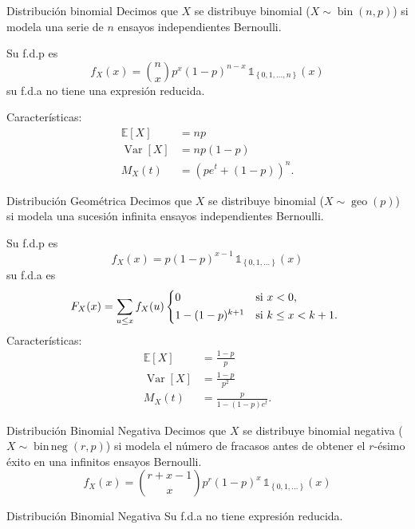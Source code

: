 \documentclass[a4paper]{article}
\theoremstyle{mytheoremstyle}
\newcommand{\E}{\mathbb{E}}
\newcommand{\1}{\mathds{1}}
\providecommand{\set}[1]{\left\{#1\right\}}
\DeclareMathOperator{\Var}{Var}
\DeclareMathOperator{\bin}{bin}
\DeclareMathOperator{\geo}{geo}
\DeclareMathOperator{\binneg}{bin\,neg}
\begin{document}
\begin{multicols*}{3}
\columnbreak

\begin{roundbox}{Distribución binomial}
    Decimos que $X$ se distribuye binomial ($X \sim \bin(n,p)$) si modela una serie de $n$ ensayos independientes Bernoulli.

    Su f.d.p es 
    \[
        f_X(x) = \binom{n}{x} p^x (1-p)^{n-x} \, \1_{\set{0, 1, \dots, n}} (x)
    \]
    su f.d.a no tiene una expresión reducida. 

    Características:
    \begin{align*}
        \E[X] &= np \\
        \Var[X] &= np(1-p) \\
        M_X(t) &= (pe^t + (1-p))^n.
    \end{align*}
\end{roundbox}

\begin{roundbox}{Distribución Geométrica}
    Decimos que $X$ se distribuye binomial ($X \sim \geo(p)$) si modela una sucesión infinita ensayos independientes Bernoulli.

    Su f.d.p es 
    \[
        f_X(x) = p (1-p)^{x-1} \, \1_{\set{0,1, \dots}}(x)
    \]
    su f.d.a es
    \[
        F_X (x) = \sum_{u \leq x} f_X (u)
       \begin{cases*}
           0 & si $x<0$, \\
           1 - (1-p)^{k+1} & si $k \leq x < k+1$.
       \end{cases*}   
    \]
    Características:
    \begin{align*}
        \E[X] &= \frac{1-p}{p} \\
        \Var[X] &= \frac{1-p}{p^2} \\
        M_X(t) &= \frac{p}{1-(1-p)e^t}.
    \end{align*}
\end{roundbox}

\begin{roundbox}{Distribución Binomial Negativa}
    Decimos que $X$ se distribuye binomial negativa ($X \sim \binneg(r,p)$) si modela el número de fracasos antes de obtener el $r$-ésimo éxito en una infinitos ensayos Bernoulli.
    \[
        f_X(x) = \binom{r+x-1}{x} p^r (1-p)^{x} \, \1_{\set{0,1, \dots}}(x)
    \]
\end{roundbox}

\begin{roundbox}{Distribución Binomial Negativa}
    Su f.d.a no tiene expresión reducida. 
    

\end{roundbox}
\end{multicols*}
\end{document}
